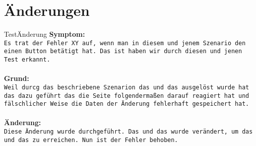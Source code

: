 \section{Änderungen}
\begin{Change}{TestÄnderung}
    \textbf{Symptom:}\\
    \texttt{Es trat der Fehler XY auf, wenn man in diesem und jenem Szenario den einen Button betätigt hat. Das ist haben wir durch diesen und jenen Test erkannt.}\\
    \\
    \textbf{Grund:}\\
    \texttt{Weil durcg das beschriebene Szenarion das und das ausgelöst wurde hat das dazu geführt das die Seite folgendermaßen darauf reagiert hat und fälschlicher Weise die Daten der Änderung fehlerhaft gespeichert hat.}\\
    \\
    \textbf{Änderung:}\\
    \texttt{Diese Änderung wurde durchgeführt. Das und das wurde verändert, um das und das zu erreichen. Nun ist der Fehler behoben.}\\

\end{Change}